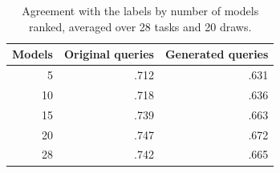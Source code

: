 \begin{table}[t]
\centering\small
\begin{tabular}{rrr}
\toprule
Models & Original queries & Generated queries \\
\midrule
5 & .712 & .631 \\
10 & .718 & .636 \\
15 & .739 & .663 \\
20 & .747 & .672 \\
28 & .742 & .665 \\
\bottomrule
\end{tabular}
\caption{Agreement with the labels by number of models ranked, averaged over 28 tasks and 20 draws.}
\label{tab:num_models}
\end{table}
